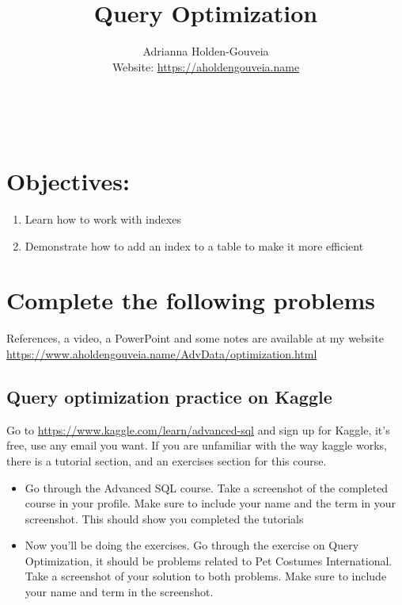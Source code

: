 \documentclass[12pt]{article}
\title{Query Optimization}
\author{
        Adrianna Holden-Gouveia \\
        Website: \url{https://aholdengouveia.name}\\ 
        \date{\vspace{-5ex}}
        \faLinkedin{: aholdengouveia} \\
        \faGithub {: aholdengouveia} \\
        }
\begin{document}
    

\maketitle


\section*{Objectives:}
\begin{enumerate}
    \item Learn how to work with indexes
    \item Demonstrate how to add an index to a table to make it more efficient
\end{enumerate}
\section*{Complete the following problems}

References, a video, a PowerPoint and some notes are available at my website
\url {https://www.aholdengouveia.name/AdvData/optimization.html}


\subsection*{Query optimization practice on Kaggle}
    Go to \url{https://www.kaggle.com/learn/advanced-sql} and sign up for Kaggle, it's free, use any email you want.  If you are unfamiliar with the way kaggle works, there is a tutorial section, and an exercises section for this course. 
        \begin{itemize}
            \item Go through the Advanced SQL course. Take a screenshot of the completed course in your profile.  Make sure to include your name and the term in your screenshot.  This should show you completed the tutorials
            \item Now you'll be doing the exercises.  Go through the exercise on Query Optimization, it should be problems related to Pet Costumes International. Take a screenshot of your solution to both problems. Make sure to include your name and term in the screenshot.
        \end{itemize}
\end{document}
